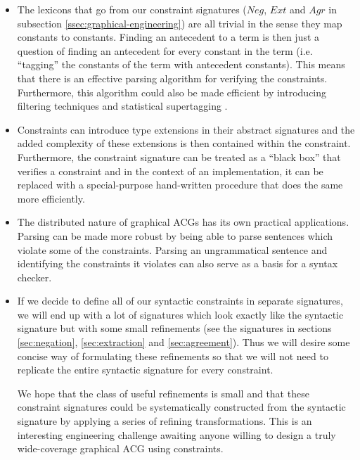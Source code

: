 \begin{itemize}
\item The lexicons that go from our constraint signatures ($Neg$, $Ext$
  and $Agr$ in subsection \ref{ssec:graphical-engineering}) are all
  trivial in the sense they map constants to constants. Finding an
  antecedent to a term is then just a question of finding an antecedent
  for every constant in the term (i.e. ``tagging'' the constants of the
  term with antecedent constants). This means that there is an effective
  parsing algorithm for verifying the constraints. Furthermore, this
  algorithm could also be made efficient by introducing filtering
  techniques \cite{guillaume2008toolchain} and statistical supertagging
  \cite{moot2012categorial}.

\item Constraints can introduce type extensions in their abstract
  signatures and the added complexity of these extensions is then
  contained within the constraint. Furthermore, the constraint signature
  can be treated as a ``black box'' that verifies a constraint and in
  the context of an implementation, it can be replaced with a
  special-purpose hand-written procedure that does the same more
  efficiently.

\item The distributed nature of graphical ACGs has its own practical
  applications. Parsing can be made more robust by being able to parse
  sentences which violate some of the constraints. Parsing an
  ungrammatical sentence and identifying the constraints it violates can
  also serve as a basis for a syntax checker.

\item If we decide to define all of our syntactic constraints in
  separate signatures, we will end up with a lot of signatures which
  look exactly like the syntactic signature but with some small
  refinements (see the signatures in sections \ref{sec:negation},
  \ref{sec:extraction} and \ref{sec:agreement}). Thus we will desire
  some concise way of formulating these refinements so that we will not
  need to replicate the entire syntactic signature for every
  constraint.

  We hope that the class of useful refinements is small and that these
  constraint signatures could be systematically constructed from the
  syntactic signature by applying a series of refining
  transformations. This is an interesting engineering challenge awaiting
  anyone willing to design a truly wide-coverage graphical ACG using
  constraints.
\end{itemize}


